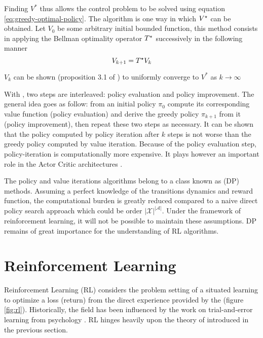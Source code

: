 Finding $V^*$ thus allows the control problem to be solved using
equation \ref{eq:greedy-optimal-policy}. The  algorithm is
one way in which $V^\star$ can be obtained. Let $V_0$ be some arbitrary initial
bounded function, this method consists in applying the Bellman optimality operator
$T^\star$ successively in the following manner
\begin{equation}
V_{k+1} = T^\star V_k \label{eq:value-iteration}
\end{equation}

$V_k$ can be shown (proposition 3.1 of \cite{Ross1983}) to uniformly converge to $V^*$ as $k \to \infty$

With , two steps are interleaved: policy evaluation and
policy improvement. The general idea goes as follow: from an initial policy $\pi_0$
compute its corresponding value function (policy evaluation) and derive the greedy
policy $\pi_{k+1}$ from it (policy improvement), then repeat these two steps as
necessary. It can be shown that the policy computed by policy
iteration after $k$ steps is not worse than the greedy policy computed
by value iteration. Because of the policy evaluation step, policy-iteration is
computationally more expensive. It plays however an important role in the Actor
Critic architectures \parencite{Sutton1984}.

The policy and value iterations algorithms belong to a class known as
 (DP) methods. Assuming a perfect knowledge of the
transitions dynamics and reward function, the computational 
burden is greatly reduced compared to a naive direct policy search approach which could be order
$\left\vert \mathcal{X} \right\vert^{\left\vert \mathcal{A} \right\vert}$. Under the framework of reinforcement learning, it will not be possible to maintain these assumptions. DP remains of great importance for the understanding of RL algorithms.

\section{Reinforcement Learning}

Reinforcement Learning (RL) considers the problem setting of a situated
 learning to optimize a loss (return) from the direct experience
provided by the  (figure \ref{fig:rl}). Historically, the field has
been influenced by the work on trial-and-error learning from
psychology \parencite{SuttonBarto1998}. RL hinges heavily upon the theory of \mdps introduced in the previous section.

